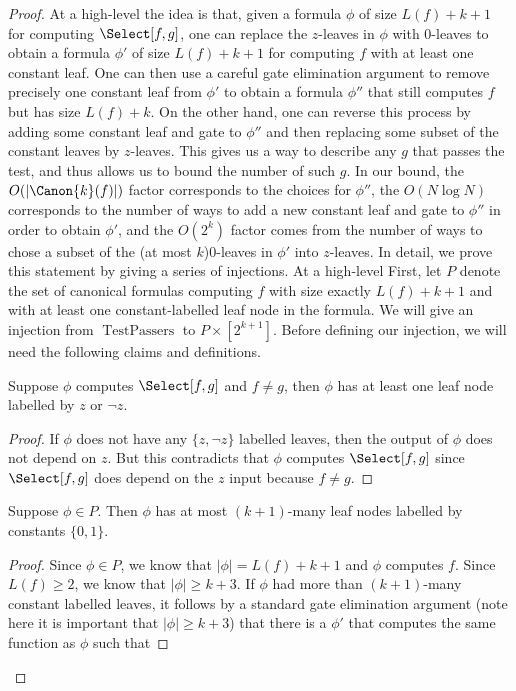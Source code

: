 \begin{proof}
At a high-level the idea is that, given a formula $\phi$ of size $L(f)+k+1$ for computing $\Select[f,g]$, one can replace the $z$-leaves in $\phi$ with 0-leaves to obtain a formula $\phi'$ of size $L(f)+k+1$ for computing $f$ with at least one constant leaf. One can then use a careful gate elimination argument to remove precisely one constant leaf from $\phi'$ to obtain a formula $\phi''$ that still computes $f$ but has size $L(f)+k$. On the other hand, one can reverse this process by adding some constant leaf and gate to $\phi''$ and then replacing some subset of the constant leaves by $z$-leaves.
This gives us a way to describe any $g$ that passes the test, and thus allows us to bound the number of such $g$. In our bound, the $O(|\Canon{k}(f)|)$ factor corresponds to the choices for $\phi''$, the $O(N\log N)$ corresponds to the number of ways to add a new constant leaf and gate to $\phi''$ in order to obtain $\phi'$, and the $O(2^k)$ factor comes from the number of ways to chose a subset of the (at most $k$)0-leaves in $\phi'$ into $z$-leaves.
In detail, we prove this statement by giving a series of injections. At a high-level First, let $P$ denote the set of canonical formulas computing $f$ with size exactly $L(f)+k+1$ and with at least one constant-labelled leaf node in the formula.
We will give an injection from $\operatorname{TestPassers}$ to $P\times[2^{k+1}]$. Before defining our injection, we will need the following claims and definitions.
\begin{ntclaim}
Suppose $\phi$ computes $\Select[f,g]$ and $f\ne g$, then $\phi$ has at least one leaf node labelled by $z$ or $\neg z$.
\end{ntclaim}
\begin{proof}
If $\phi$ does not have any $\{z,\neg z\}$ labelled leaves, then the output of $\phi$ does not depend on $z$. But this contradicts that $\phi$ computes $\Select[f,g]$ since $\Select[f,g]$ does depend on the $z$ input because $f\ne g$.
\end{proof}
\begin{ntclaim}
Suppose $\phi\in P$. Then $\phi$ has at most $(k+1)$-many leaf nodes labelled by constants $\{0,1\}$.
\end{ntclaim}
\begin{proof}
Since $\phi\in P$, we know that $|\phi|=L(f)+k+1$ and $\phi$ computes $f$. Since $L(f)\geq 2$, we know that $|\phi|\geq k+3$.
If $\phi$ had more than $(k+1)$-many constant labelled leaves, it follows by a standard gate elimination argument (note here it is important that $|\phi|\geq k+3$) that there is a $\phi'$ that computes the same function as $\phi$ such that

\end{proof}
\end{proof}
